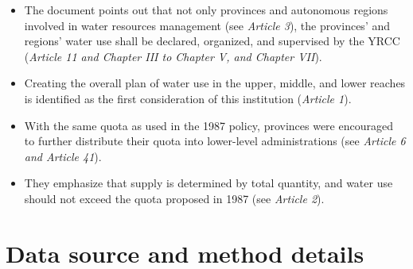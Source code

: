 \documentclass[preprint, 12pt]{elsarticle}
\begin{document}
\begin{itemize}
\item The document points out that not only provinces and autonomous regions involved in water resources management (see \textit{Article 3}), the provinces’ and regions’ water use shall be declared, organized, and supervised by the YRCC (\textit{Article 11 and Chapter III to Chapter V, and Chapter VII}).
\item Creating the overall plan of water use in the upper, middle, and lower reaches is identified as the first consideration of this institution (\textit{Article 1}).
\item With the same quota as used in the 1987 policy, provinces were encouraged to further distribute their quota into lower-level administrations (see \textit{Article 6 and Article 41}).
\item They emphasize that supply is determined by total quantity, and water use should not exceed the quota proposed in 1987 (see \textit{Article 2}).
\end{itemize}




\newpage
\section{Data source and method details}\label{secS2}
\renewcommand{\thefigure}{B\arabic{figure}}
\renewcommand{\thetable}{B\arabic{table}}
\setcounter{figure}{0}
\setcounter{table}{0}
\end{document}
